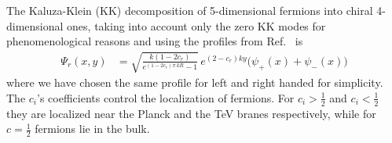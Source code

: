 \documentclass[twocolumn,showpacs,showkeys,prd,superscriptaddress]{revtex4-1}
\begin{document}

The Kaluza-Klein (KK) decomposition of 5-dimensional fermions into chiral 4-dimensional ones, taking into account only the zero KK modes for phenomenological reasons and using the profiles from Ref.~\cite{Gherghetta:2000qt} is
\begin{align}
  \Psi_r(x,y) &= \sqrt{\frac{k\left(1-2c_r\right)}{e^{(1-2c_r)\pi\,kR}-1}}\,e^{(2-c_r)ky}\bigg(\psi_+(x) + \psi_-(x)\bigg)
\end{align}
where we have chosen the same profile for left and right handed for simplicity. The $c_i$'s coefficients control the localization of fermions. %
For $c_i>\tfrac{1}{2}$ and $c_i<\tfrac{1}{2}$
they are localized near the Planck and the TeV branes respectively,
while for $c=\tfrac{1}{2}$ fermions lie in the bulk.



\end{document}

